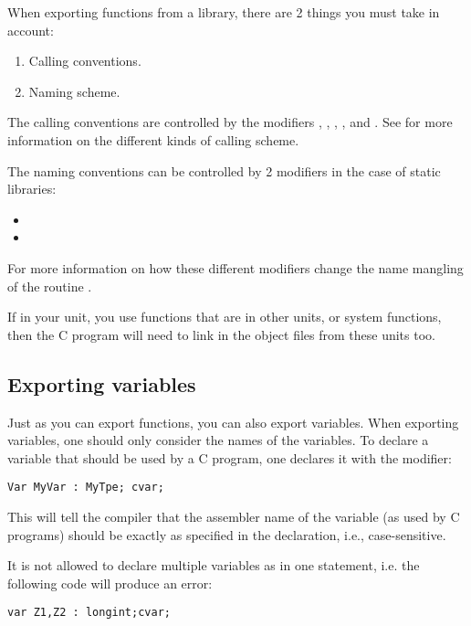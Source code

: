 When exporting functions from a library, there are 2 things you must take in
account:

\begin{enumerate}
\item Calling conventions.
\item Naming scheme.
\end{enumerate}
The calling conventions are controlled by the modifiers ,
, , ,  and
. See  for more information on the
different kinds of calling scheme.

The naming conventions can be controlled by 2 modifiers in the case
of static libraries:
\begin{itemize}
\item {}
\item {}
\end{itemize}

For more information on how these different modifiers change the name
mangling of the routine .


\begin{remark}
If in your unit, you use functions that are in other units, or system 
functions, then the C program will need to link in the object files
from these units too.
\end{remark}

\subsection{Exporting variables}
Just as you can export functions, you can also export variables.
When exporting variables, one should only consider the names of the
variables. To declare a variable that should be used by a C program,
one declares it with the  modifier:
\begin{verbatim}
Var MyVar : MyTpe; cvar;
\end{verbatim}
This will tell the compiler that the assembler name of the variable 
(as used by C programs) should be exactly as specified in the
declaration, i.e., case-sensitive.

It is not allowed to declare multiple variables as  in one
statement, i.e. the following code will produce an error:
\begin{verbatim}
var Z1,Z2 : longint;cvar;
\end{verbatim}

